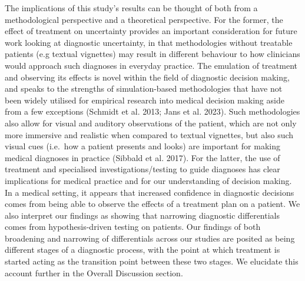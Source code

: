 \documentclass[a4paper, nobind]{templates/ociamthesis}
\begin{document}
The implications of this study's results can be thought of both from a methodological perspective and a theoretical perspective. For the former, the effect of treatment on uncertainty provides an important consideration for future work looking at diagnostic uncertainty, in that methodologies without treatable patients (e.g textual vignettes) may result in different behaviour to how clinicians would approach such diagnoses in everyday practice. The emulation of treatment and observing its effects is novel within the field of diagnostic decision making, and speaks to the strengths of simulation-based methodologies that have not been widely utilised for empirical research into medical decision making aside from a few exceptions (Schmidt et al. 2013; Jans et al. 2023). Such methodologies also allow for visual and auditory observations of the patient, which are not only more immersive and realistic when compared to textual vignettes, but also such visual cues (i.e.~how a patient presents and looks) are important for making medical diagnoses in practice (Sibbald et al. 2017). For the latter, the use of treatment and specialised investigations/testing to guide diagnoses has clear implications for medical practice and for our understanding of decision making. In a medical setting, it appears that increased confidence in diagnostic decisions comes from being able to observe the effects of a treatment plan on a patient. We also interpret our findings as showing that narrowing diagnostic differentials comes from hypothesis-driven testing on patients. Our findings of both broadening and narrowing of differentials across our studies are posited as being different stages of a diagnostic process, with the point at which treatment is started acting as the transition point between these two stages. We elucidate this account further in the Overall Discussion section.
\end{document}
